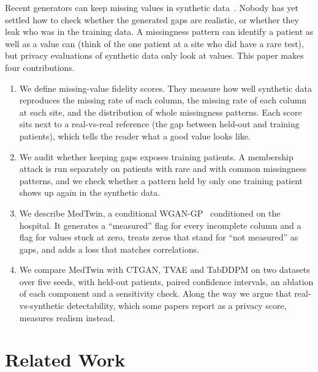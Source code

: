 \documentclass[runningheads]{llncs}
\begin{document}
Recent generators can keep missing values in synthetic
data~\cite{ouyang2023missdiff,wang2025reinvented,wang2024igamt}.
Nobody has yet settled how to check whether the generated gaps are
realistic, or whether they leak who was in the training data. A
missingness pattern can identify a patient as well as a value can (think of
the one patient at a site who did have a rare test), but privacy
evaluations of synthetic data only look at values. This paper makes four
contributions.
\begin{enumerate}
\item We define missing-value fidelity scores. They measure how well
  synthetic data reproduces the missing rate of each column, the missing
  rate of each column at each site, and the distribution of whole
  missingness patterns. Each score sits next to a real-vs-real reference
  (the gap between held-out and training patients), which tells the reader
  what a good value looks like.
\item We audit whether keeping gaps exposes training patients. A
  membership attack is run separately on patients with rare and with common
  missingness patterns, and we check whether a pattern held by only one
  training patient shows up again in the synthetic data.
\item We describe MedTwin, a conditional
  WGAN-GP~\cite{gulrajani2017wgangp} conditioned on the hospital. It
  generates a ``measured'' flag for every incomplete column and a flag for
  values stuck at zero, treats zeros that stand for ``not measured'' as
  gaps, and adds a loss that matches correlations.
\item We compare MedTwin with CTGAN, TVAE and TabDDPM on two datasets over
  five seeds, with held-out patients, paired confidence intervals, an
  ablation of each component and a sensitivity check. Along the way we argue
  that real-vs-synthetic detectability, which some papers report as a
  privacy score, measures realism instead.
\end{enumerate}

\section{Related Work}
\end{document}
